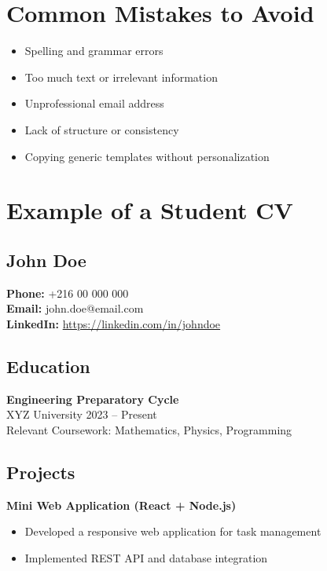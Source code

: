 \documentclass[11pt,a4paper]{article}
\begin{document}
\section{Common Mistakes to Avoid}

\begin{itemize}
    \item Spelling and grammar errors
    \item Too much text or irrelevant information
    \item Unprofessional email address
    \item Lack of structure or consistency
    \item Copying generic templates without personalization
\end{itemize}

\section{Example of a Student CV}

\subsection*{\textcolor{primary}{John Doe}}
\textbf{Phone:} +216 00 000 000 \\
\textbf{Email:} john.doe@email.com \\
\textbf{LinkedIn:} \url{https://linkedin.com/in/johndoe}

\vspace{0.3cm}

\subsection*{Education}
\textbf{Engineering Preparatory Cycle} \\
XYZ University \hfill 2023 -- Present \\
Relevant Coursework: Mathematics, Physics, Programming

\vspace{0.3cm}

\subsection*{Projects}
\textbf{Mini Web Application (React + Node.js)} \\
\begin{itemize}
    \item Developed a responsive web application for task management
    \item Implemented REST API and database integration
\end{itemize}
\end{document}
